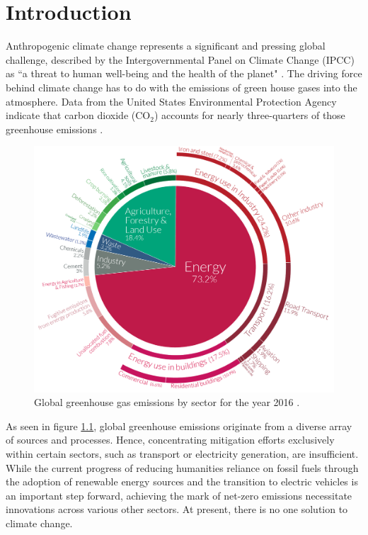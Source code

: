 \chapter{Introduction}

Anthropogenic climate change represents a significant and pressing global challenge, described by the Intergovernmental Panel on Climate Change (IPCC) as ``a threat to human well-being and the health of the planet" \cite{ipcc_2022}. The driving force behind climate change has to do with the emissions of green house gases into the atmosphere. Data from the United States Environmental Protection Agency indicate that carbon dioxide (CO$_2$) accounts for nearly three-quarters of those greenhouse emissions \cite{epa_2019}. 

\begin{figure}[h!]
	\centering
	\includegraphics[width=\linewidth]{chapter_1/figures/emissions.png}
	\caption{Global greenhouse gas emissions by sector for the year 2016 \cite{ritchie_roser_2020}.}
	\label{fig:green_house_gas_emissions}
\end{figure} 

As seen in figure \ref{fig:green_house_gas_emissions}, global greenhouse emissions originate from a diverse array of sources and processes. Hence, concentrating mitigation efforts exclusively within certain sectors, such as transport or electricity generation, are insufficient. While the current progress of reducing humanities reliance on fossil fuels through the adoption of renewable energy sources and the transition to electric vehicles is an important step forward, achieving the mark of net-zero emissions necessitate innovations across various other sectors. At present, there is no one solution to climate change.

